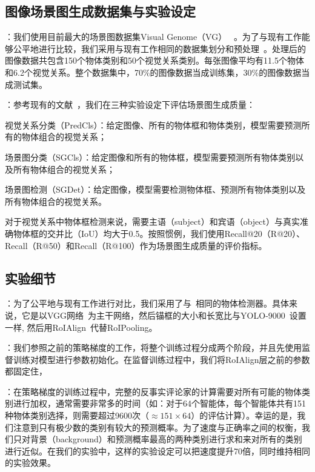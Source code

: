 \subsection{图像场景图生成数据集与实验设定}

：我们使用目前最大的场景图数据集Visual Genome（VG） ~\cite{krishna2017visual}。为了与现有工作能够公平地进行比较，我们采用与现有工作相同的数据集划分和预处理~\cite{xu2017scene, zellers2018neural, newell2017pixels, yang2018graph, herzig2018mapping}。处理后的图像数据共包含150个物体类别和50个视觉关系类别。每张图像平均有11.5个物体和6.2个视觉关系。整个数据集中，70\%的图像数据当成训练集，30\%的图像数据当成测试集。


：参考现有的文献~\cite{xu2017scene, zellers2018neural, jae2018tensorize}，我们在三种实验设定下评估场景图生成质量：
\begin{asparaenum}
\item 视觉关系分类（PredCls）：给定图像、所有的物体框和物体类别，模型需要预测所有的物体组合的视觉关系；

\item 场景图分类（SGCls）：给定图像和所有的物体框，模型需要预测所有物体类别以及所有物体组合的视觉关系；

\item 场景图检测（SGDet）：给定图像，模型需要检测物体框、预测所有物体类别以及所有物体组合的视觉关系。
\end{asparaenum}

对于视觉关系中物体框检测来说，需要主语（subject）和宾语（object）与真实准确物体框的交并比（IoU）均大于0.5。按照惯例，我们使用Recall@20（R@20）、Recall（R@50）和Recall（R@100）作为场景图生成质量的评价指标。


\subsection{实验细节}


：为了公平地与现有工作进行对比，我们采用了与~\cite{zellers2018neural}相同的物体检测器。具体来说，它是以VGG网络~\cite{simonyan2015very}为主干网络，然后锚框的大小和长宽比与YOLO-9000~\cite{redmon2017yolo9000}设置一样, 然后用RoIAlign~\cite{he2017mask}代替RoIPooling。


：我们参照之前的策略梯度的工作，将整个训练过程分成两个阶段，并且先使用监督训练对模型进行参数初始化。在监督训练过程中，我们将RoIAlign层之前的参数都固定住，


：在策略梯度的训练过程中，完整的反事实评论家的计算需要对所有可能的物体类别进行加权，通常需要非常多的时间（如：对于64个智能体，每个智能体共有151种物体类别选择，则需要超过9600次（$\approx 151 \times 64$）的评估计算）。幸运的是，我们注意到只有极少数的类别有较大的预测概率。为了速度与正确率之间的权衡，我们只对背景（background）和预测概率最高的两种类别进行求和来对所有的类别进行近似。在我们的实验中，这样的实验设定可以把速度提升70倍，同时维持相同的实验效果。


